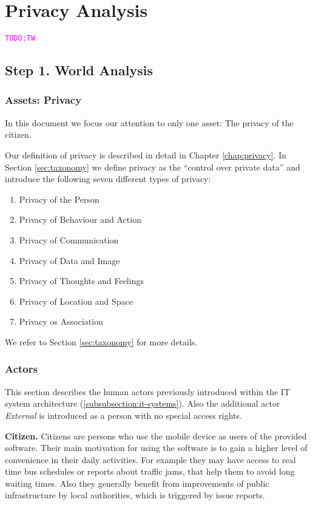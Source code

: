 \documentclass[runningheads,a4paper]{llncs}
\newcommand{\TODO}[1]{\begin{alltt}\textcolor{magenta}{TODO: #1}\end{alltt}}
\newenvironment{LGContent}
{ \par\color{blue} \it \small }
{ \par }
\begin{document}
\section{Privacy Analysis}

\TODO{TW}

\begin{LGContent}
\subsection{Step 1. World Analysis}

\subsubsection{Assets: Privacy}

In this document we focus our attention to only one asset: The privacy of the citizen.

Our definition of privacy is described in detail in Chapter \ref{chap:privacy}. In Section \ref{sec:taxonomy} we define privacy as the ``control over private data'' and introduce the following seven different types of privacy:
\begin{enumerate}
\item Privacy of the Person
\item Privacy of Behaviour and Action
\item Privacy of Communication
\item Privacy of Data and Image
\item Privacy of Thoughts and Feelings
\item Privacy of Location and Space
\item Privacy os Association
\end{enumerate}

We refer to Section \ref{sec:taxonomy} for more details.


%
%
%
%


\subsubsection{Actors}
\label{subsubsection:humans}

This section describes the human actors previously introduced within the IT system architecture (\ref{subsubsection:it-systems}).
Also the additional actor \textit{External} is introduced as a person with no special access rights.

\textbf{Citizen.}
Citizens are persons who use the mobile device as users of the provided software.
Their main motivation for using the software is to gain a higher level of convenience in their daily activities. For example they may have access to real time bus schedules or reports about traffic jams, that help them to avoid long waiting times.
Also they generally benefit from improvements of public infrastructure by local authorities, which is triggered by issue reports.


\end{LGContent}
\end{document}

